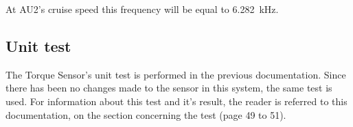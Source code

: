 At AU2's cruise speed this frequency will be equal to \SI{6.282}{\kilo \hertz}.

\subsection{Unit test}
The Torque Sensor's unit test is performed in the previous documentation. Since there has been no changes made to the sensor in this system, the same test is used. For information about this test and it's result, the reader is referred to this documentation\cite{BAC_rullefelt}, on the section concerning the test (page 49 to 51).